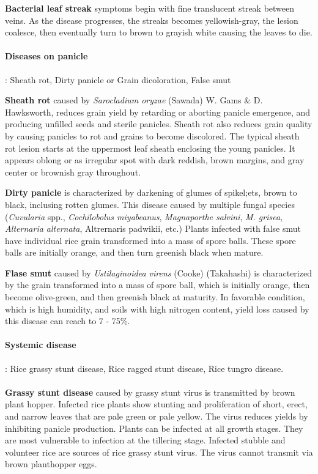 \textbf{Bacterial leaf streak} symptoms begin with fine translucent streak between veins. As the disease progresses, the streaks becomes yellowish-gray, the lesion coalesce, then eventually turn to brown to grayish white causing the leaves to die.

\paragraph{Diseases on panicle}: Sheath rot, Dirty panicle or Grain dicoloration, False smut

\textbf{Sheath rot} caused by \textit{Sarocladium oryzae} (Sawada) W. Gams \& D. Hawksworth, reduces grain yield by retarding or aborting panicle emergence, and producing unfilled seeds and sterile panicles. Sheath rot also reduces grain quality by causing panicles to rot and grains to become discolored. The typical sheath rot lesion starts at the uppermost leaf sheath enclosing the young panicles. It appears oblong or as irregular spot with dark reddish, brown margins, and gray center or brownish gray throughout.

\textbf{Dirty panicle} is characterized by darkening of glumes of spikel;ets, brown to black, inclusing rotten glumes. This disease caused by multiple fungal species (\textit{Cuvularia} spp., \textit{Cochilobolus miyabeanus}, \textit{Magnaporthe salvini}, \textit{M. grisea}, \textit{Alternaria alternata}, Altrernaris padwikii, etc.)
Plants infected with false smut have individual rice grain transformed into a mass of spore balls. These spore balls are initially orange, and then turn greenish black when mature.

\textbf{Flase smut} caused by \textit{ Ustilaginoidea virens} (Cooke) (Takahashi) is characterized by the grain transformed into a mass of spore ball, which is initially orange, then become olive-green, and then greenish black at maturity. In favorable condition, which is high humidity, and soils with high nitrogen content, yield loss caused by this disease can reach to 7 - 75\%.

\paragraph{Systemic disease}: Rice grassy stunt disease, Rice ragged stunt disease, Rice tungro disease. \\
\\
\textbf{Grassy stunt disease} caused by grassy stunt virus is transmitted by brown plant hopper. Infected rice plants show stunting and proliferation of short, erect, and narrow leaves that are pale green or pale yellow. The virus reduces yields by inhibiting panicle production. Plants can be infected at all growth stages. They are most vulnerable to infection at the tillering stage. Infected stubble and volunteer rice are sources of rice grassy stunt virus. The virus cannot transmit via brown planthopper eggs.

